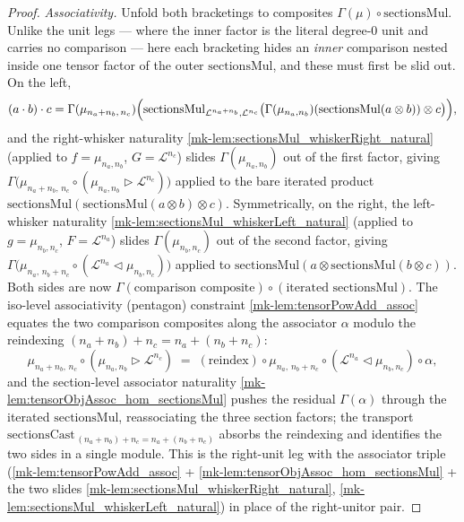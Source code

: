 \begin{proof}
  \emph{Associativity.} Unfold both bracketings to composites
  \(\Gamma(\mu) \circ \mathrm{sectionsMul}\). Unlike the unit legs --- where the
  inner factor is the literal degree-\(0\) unit and carries no comparison --- here
  each bracketing hides an \emph{inner} comparison nested inside one tensor factor of
  the outer \(\mathrm{sectionsMul}\), and these must first be slid out. On the left,
  \[
    (a \cdot b) \cdot c
      = \Gamma(\mu_{n_a+n_b,\,n_c})\Bigl(
          \mathrm{sectionsMul}_{\mathcal{L}^{n_a+n_b},\mathcal{L}^{n_c}}\bigl(
            \Gamma(\mu_{n_a,n_b})(\mathrm{sectionsMul}(a \otimes b)) \otimes c\bigr)\Bigr),
  \]
  and the right-whisker naturality \ref{mk-lem:sectionsMul_whiskerRight_natural}
  (applied to \(f = \mu_{n_a,n_b}\), \(G = \mathcal{L}^{n_c}\)) slides
  \(\Gamma(\mu_{n_a,n_b})\) out of the first factor, giving
  \(\Gamma\bigl(\mu_{n_a+n_b,\,n_c} \circ (\mu_{n_a,n_b} \rhd \mathcal{L}^{n_c})\bigr)\)
  applied to the bare iterated product
  \(\mathrm{sectionsMul}(\mathrm{sectionsMul}(a \otimes b) \otimes c)\). Symmetrically,
  on the right, the left-whisker naturality
  \ref{mk-lem:sectionsMul_whiskerLeft_natural} (applied to \(g = \mu_{n_b,n_c}\),
  \(F = \mathcal{L}^{n_a}\)) slides \(\Gamma(\mu_{n_b,n_c})\) out of the second factor,
  giving \(\Gamma\bigl(\mu_{n_a,\,n_b+n_c} \circ (\mathcal{L}^{n_a} \lhd \mu_{n_b,n_c})\bigr)\)
  applied to \(\mathrm{sectionsMul}(a \otimes \mathrm{sectionsMul}(b \otimes c))\). Both
  sides are now \(\Gamma(\text{comparison composite}) \circ (\text{iterated }
  \mathrm{sectionsMul})\). The iso-level associativity (pentagon) constraint
  \ref{mk-lem:tensorPowAdd_assoc} equates the two comparison composites along the
  associator \(\alpha\) modulo the reindexing
  \((n_a+n_b)+n_c = n_a+(n_b+n_c)\):
  \[
    \mu_{n_a+n_b,\,n_c} \circ (\mu_{n_a,n_b} \rhd \mathcal{L}^{n_c})
      \;=\;
    \mathrm{(reindex)} \circ \mu_{n_a,\,n_b+n_c}
      \circ (\mathcal{L}^{n_a} \lhd \mu_{n_b,n_c}) \circ \alpha,
  \]
  and the section-level associator naturality
  \ref{mk-lem:tensorObjAssoc_hom_sectionsMul} pushes the residual \(\Gamma(\alpha)\)
  through the iterated \(\mathrm{sectionsMul}\), reassociating the three section
  factors; the transport
  \(\mathrm{sectionsCast}_{\,(n_a+n_b)+n_c = n_a+(n_b+n_c)}\) absorbs the reindexing
  and identifies the two sides in a single module. This is the right-unit leg with the
  associator triple
  (\ref{mk-lem:tensorPowAdd_assoc} + \ref{mk-lem:tensorObjAssoc_hom_sectionsMul} +
  the two slides \ref{mk-lem:sectionsMul_whiskerRight_natural},
  \ref{mk-lem:sectionsMul_whiskerLeft_natural}) in place of the right-unitor pair.


\end{proof}
